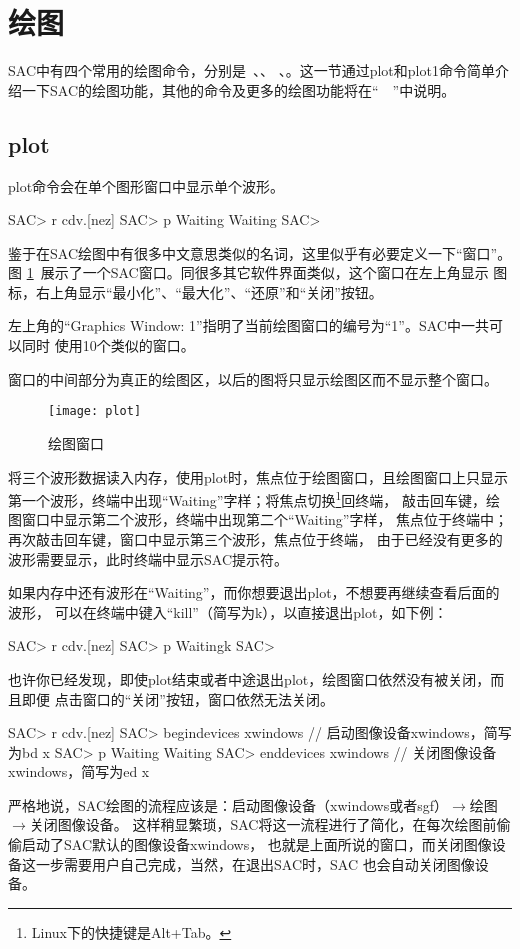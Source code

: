 \section{绘图}
\label{sec:display}

SAC中有四个常用的绘图命令，分别是~、、
、。这一节通过plot和plot1命令简单介绍一下SAC的绘图功能，其他的命令及更多的绘图功能将在``~~''中说明。

\subsection{plot}
\label{subsec:plot}
plot命令会在单个图形窗口中显示单个波形。
\begin{SACCode}
SAC> r cdv.[nez]
SAC> p
Waiting
Waiting
SAC>
\end{SACCode}

鉴于在SAC绘图中有很多中文意思类似的名词，这里似乎有必要定义一下``窗口''。图
\ref{fig:plot}~展示了一个SAC窗口。同很多其它软件界面类似，这个窗口在左上角显示
图标，右上角显示``最小化''、``最大化''、``还原''和``关闭''按钮。

左上角的``Graphics Window: 1''指明了当前绘图窗口的编号为``1''。SAC中一共可以同时
使用10个类似的窗口。

窗口的中间部分为真正的绘图区，以后的图将只显示绘图区而不显示整个窗口。

\begin{figure}[H]
\centering
\texttt{[image: plot]}
\caption{绘图窗口}
\label{fig:plot}
\end{figure}

将三个波形数据读入内存，使用plot时，焦点位于绘图窗口，且绘图窗口上只显示
第一个波形，终端中出现``Waiting''字样；将焦点切换\footnote{Linux下的快捷键是Alt+Tab。}回终端，
敲击回车键，绘图窗口中显示第二个波形，终端中出现第二个``Waiting''字样，
焦点位于终端中；再次敲击回车键，窗口中显示第三个波形，焦点位于终端，
由于已经没有更多的波形需要显示，此时终端中显示SAC提示符。

如果内存中还有波形在``Waiting''，而你想要退出plot，不想要再继续查看后面的波形，
可以在终端中键入``kill''（简写为k），以直接退出plot，如下例：
\begin{SACCode}
SAC> r cdv.[nez]
SAC> p
Waitingk
SAC>
\end{SACCode}

也许你已经发现，即使plot结束或者中途退出plot，绘图窗口依然没有被关闭，而且即便
点击窗口的``关闭''按钮，窗口依然无法关闭。
\begin{SACCode}
SAC> r cdv.[nez]
SAC> begindevices xwindows      // 启动图像设备xwindows，简写为bd x
SAC> p
Waiting
Waiting
SAC> enddevices xwindows        // 关闭图像设备xwindows，简写为ed x
\end{SACCode}
严格地说，SAC绘图的流程应该是：启动图像设备（xwindows或者sgf）$\rightarrow$绘图$\rightarrow$关闭图像设备。
这样稍显繁琐，SAC将这一流程进行了简化，在每次绘图前偷偷启动了SAC默认的图像设备xwindows，
也就是上面所说的窗口，而关闭图像设备这一步需要用户自己完成，当然，在退出SAC时，SAC
也会自动关闭图像设备。

